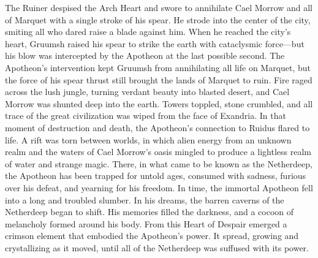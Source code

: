 \documentclass[10pt,a4,twoside,twocolumn,openany,nodeprecatedcode]{dndbook}
\begin{document}
The Ruiner despised the Arch Heart and swore to annihilate Cael Morrow and all of Marquet with a single stroke of his spear. He strode into the center of the city, smiting all who dared raise a blade against him. When he reached the city's heart, Gruumsh raised his spear to strike the earth with cataclysmic force—but his blow was intercepted by the Apotheon at the last possible second.
The Apotheon's intervention kept Gruumsh from annihilating all life on Marquet, but the force of his spear thrust still brought the lands of Marquet to ruin. Fire raged across the lush jungle, turning verdant beauty into blasted desert, and Cael Morrow was shunted deep into the earth. Towers toppled, stone crumbled, and all trace of the great civilization was wiped from the face of Exandria.
In that moment of destruction and death, the Apotheon's connection to Ruidus flared to life. A rift was torn between worlds, in which alien energy from an unknown realm and the waters of Cael Morrow's oasis mingled to produce a lightless realm of water and strange magic. There, in what came to be known as the Netherdeep, the Apotheon has been trapped for untold ages, consumed with sadness, furious over his defeat, and yearning for his freedom.
In time, the immortal Apotheon fell into a long and troubled slumber. In his dreams, the barren caverns of the Netherdeep began to shift. His memories filled the darkness, and a cocoon of melancholy formed around his body. From this Heart of Despair emerged a crimson element that embodied the Apotheon's power. It spread, growing and crystallizing as it moved, until all of the Netherdeep was suffused with its power.
\end{document}
